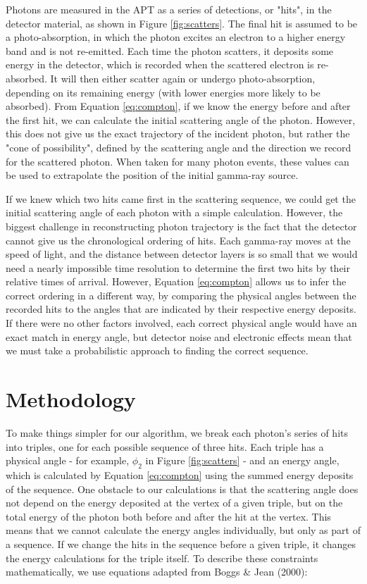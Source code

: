 Photons are measured in the APT as a series of detections, or "hits", in the detector material, as shown in Figure \ref{fig:scatters}. The final hit is assumed to be a photo-absorption, in which the photon excites an electron to a higher energy band and is not re-emitted. Each time the photon scatters, it deposits some energy in the detector, which is recorded when the scattered electron is re-absorbed. It will then either scatter again or undergo photo-absorption, depending on its remaining energy (with lower energies more likely to be absorbed). From Equation \ref{eq:compton}, if we know the energy before and after the first hit, we can calculate the initial scattering angle of the photon. However, this does not give us the exact trajectory of the incident photon, but rather the "cone of possibility", defined by the scattering angle and the direction we record for the scattered photon. When taken for many photon events, these values can be used to extrapolate the position of the initial gamma-ray source.

If we knew which two hits came first in the scattering sequence, we could get the initial scattering angle of each photon with a simple calculation. However, the biggest challenge in reconstructing photon trajectory is the fact that the detector cannot give us the chronological ordering of hits. Each gamma-ray moves at the speed of light, and the distance between detector layers is so small that we would need a nearly impossible time resolution to determine the first two hits by their relative times of arrival. However, Equation \ref{eq:compton} allows us to infer the correct ordering in a different way, by comparing the physical angles between the recorded hits to the angles that are indicated by their respective energy deposits. If there were no other factors involved, each correct physical angle would have an exact match in energy angle, but detector noise and electronic effects mean that we must take a probabilistic approach to finding the correct sequence.

\section{Methodology}
To make things simpler for our algorithm, we break each photon's series of hits into triples, one for each possible sequence of three hits. Each triple has a physical angle - for example, $\phi_2$ in Figure \ref{fig:scatters} - and an energy angle, which is calculated by Equation \ref{eq:compton} using the summed energy deposits of the sequence. One obstacle to our calculations is that the scattering angle does not depend on the energy deposited at the vertex of a given triple, but on the total energy of the photon both before and after the hit at the vertex. This means that we cannot calculate the energy angles individually, but only as part of a sequence. If we change the hits in the sequence before a given triple, it changes the energy calculations for the triple itself. To describe these constraints mathematically, we use equations adapted from Boggs \& Jean (2000)\cite{Boggs}:

